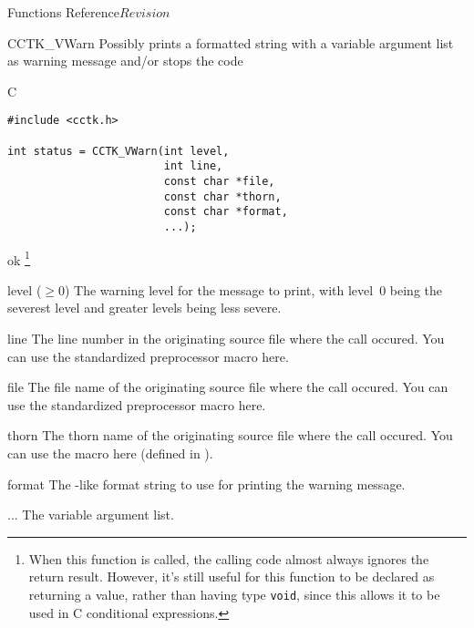 \begin{cactuspart}{ Functions Reference}{}{$Revision$}
\begin{FunctionDescription}{CCTK\_VWarn}
\label{CCTK-VWarn}
Possibly prints a formatted string with a variable argument list as
warning message and/or stops the code

\begin{SynopsisSection}
\begin{Synopsis}{C}
\begin{verbatim}
#include <cctk.h>

int status = CCTK_VWarn(int level,
                        int line,
                        const char *file,
                        const char *thorn,
                        const char *format,
                        ...);
\end{verbatim}
\end{Synopsis}
\end{SynopsisSection}

\begin{ResultSection}
\begin{Result}{0}
ok%
\footnote{%
         When this function is called, the calling code almost
         always ignores the return result.  However, it's still
         useful for this function to be declared as returning a
         value, rather than having type \texttt{void}, since this
         allows it to be used in C conditional expressions.
         }%
\end{Result}
\end{ResultSection}

\begin{ParameterSection}
\begin{Parameter}{level ($\ge 0$)}
The warning level for the message to print, with level~0 being the
severest level and greater levels being less severe.
\end{Parameter}
\begin{Parameter}{line}
The line number in the originating source file where the  call
occured. You can use the standardized  preprocessor macro here.
\end{Parameter}
\begin{Parameter}{file}
The file name of the originating source file where the  call
occured. You can use the standardized  preprocessor macro here.
\end{Parameter}
\begin{Parameter}{thorn}
The thorn name of the originating source file where the  call occured. You can use the  macro here (defined in ).
\end{Parameter}
\begin{Parameter}{format}
The -like format string to use for printing the warning message.
\end{Parameter}
\begin{Parameter}{...}
The variable argument list.
\end{Parameter}
\end{ParameterSection}


\end{FunctionDescription}
\end{cactuspart}
